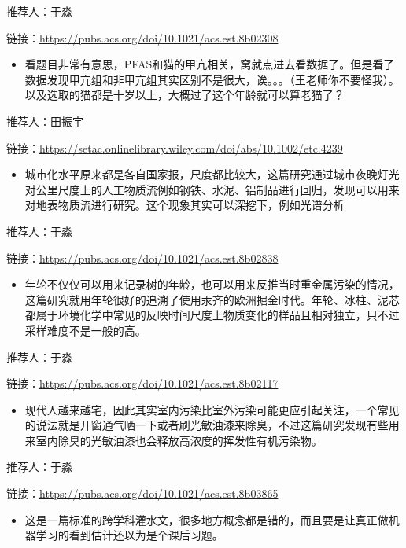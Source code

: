 \documentclass[]{book}
\providecommand{\tightlist}{%
  \setlength{\itemsep}{0pt}\setlength{\parskip}{0pt}}
\begin{document}
推荐人：于淼

链接：\url{https://pubs.acs.org/doi/10.1021/acs.est.8b02308}

\begin{itemize}
\tightlist
\item
  看题目非常有意思，PFAS和猫的甲亢相关，窝就点进去看数据了。但是看了数据发现甲亢组和非甲亢组其实区别不是很大，诶。。。（王老师你不要怪我）。以及选取的猫都是十岁以上，大概过了这个年龄就可以算老猫了？
\end{itemize}

推荐人：田振宇

链接：\url{https://setac.onlinelibrary.wiley.com/doi/abs/10.1002/etc.4239}

\begin{itemize}
\tightlist
\item
  城市化水平原来都是各自国家报，尺度都比较大，这篇研究通过城市夜晚灯光对公里尺度上的人工物质流例如钢铁、水泥、铝制品进行回归，发现可以用来对地表物质流进行研究。这个现象其实可以深挖下，例如光谱分析
\end{itemize}

推荐人：于淼

链接：\url{https://pubs.acs.org/doi/10.1021/acs.est.8b02838}

\begin{itemize}
\tightlist
\item
  年轮不仅仅可以用来记录树的年龄，也可以用来反推当时重金属污染的情况，这篇研究就用年轮很好的追溯了使用汞齐的欧洲掘金时代。年轮、冰柱、泥芯都属于环境化学中常见的反映时间尺度上物质变化的样品且相对独立，只不过采样难度不是一般的高。
\end{itemize}

推荐人：于淼

链接：\url{https://pubs.acs.org/doi/10.1021/acs.est.8b02117}

\begin{itemize}
\tightlist
\item
  现代人越来越宅，因此其实室内污染比室外污染可能更应引起关注，一个常见的说法就是开窗通气晒一下或者刷光敏油漆来除臭，不过这篇研究发现有些用来室内除臭的光敏油漆也会释放高浓度的挥发性有机污染物。
\end{itemize}

推荐人：于淼

链接：\url{https://pubs.acs.org/doi/10.1021/acs.est.8b03865}

\begin{itemize}
\tightlist
\item
  这是一篇标准的跨学科灌水文，很多地方概念都是错的，而且要是让真正做机器学习的看到估计还以为是个课后习题。
\end{itemize}
\end{document}
